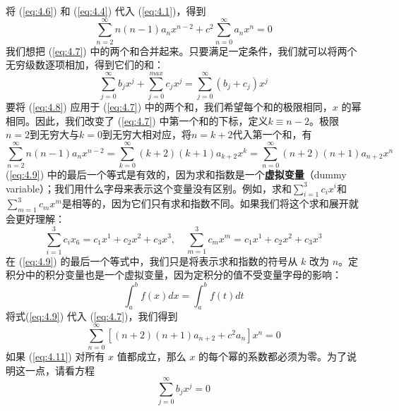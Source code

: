     将 (\ref{eq:4.6}) 和 (\ref{eq:4.4}) 代入 (\ref{eq:4.1})，得到
    \begin{equation}
        \sum_{n=2}^{\infty}n(n-1)a_nx^{n-2} + c^2\sum_{n=0}^{\infty}a_nx^n = 0
        \label{eq:4.7}
    \end{equation}
    我们想把 (\ref{eq:4.7}) 中的两个和合并起来。只要满足一定条件，我们就可以将两个无穷级数逐项相加，得到它们的和：
    \begin{equation}
        \sum_{j=0}^{\infty}b_jx^j + \sum_{j=0}^{max}c_jx^j = \sum_{j=0}^{\infty}(b_j+c_j)x^j
        \label{eq:4.8}
    \end{equation}
    要将 (\ref{eq:4.8}) 应用于 (\ref{eq:4.7}) 中的两个和，我们希望每个和的极限相同，$x$ 的幂相同。因此，我们改变了 (\ref{eq:4.7}) 中第一个和的下标，定义$k \equiv n-2$。极限$n = 2$到无穷大与$k = 0$到无穷大相对应，将$n=k+2$代入第一个和，有
    \begin{equation}
        \sum_{n=2}^{\infty}n\left(n-1\right)a_nx^{n-2} = \sum_{k=0}^{\infty}\left(k+2\right)\left(k+1\right)a_{k+2}x^k = \sum_{n=0}^{\infty}\left(n+2\right)\left(n+1\right)a_{n+2}x^n
        \label{eq:4.9}
    \end{equation}
    (\ref{eq:4.9}) 中的最后一个等式是有效的，因为求和指数是一个\textbf{虚拟变量}（dummy variable）；我们用什么字母来表示这个变量没有区别。例如，求和$\sum_{i=1}^{3}c_ix^i$和$\sum_{m=1}^{3}c_mx^m$是相等的，因为它们只有求和指数不同。如果我们将这个求和展开就会更好理解：
    \begin{equation*}
        \sum_{i=1}^{3}c_ix_6 = c_1x^1 + c_2x^2 + c_3x^3, \quad \sum_{m=1}^{3}c_mx^m = c_1x^1 + c_2x^2 + c_3x^3
    \end{equation*}
    在 (\ref{eq:4.9}) 的最后一个等式中，我们只是将表示求和指数的符号从 $k$ 改为 $n$。定积分中的积分变量也是一个虚拟变量，因为定积分的值不受变量字母的影响：
    \begin{equation}
        \int_{a}^{b}f\left(x\right)dx = \int_{a}^{b}f\left(t\right)dt
        \label{eq:4.10}
    \end{equation}
    将式(\ref{eq:4.9}) 代入 (\ref{eq:4.7})，我们得到
    \begin{equation}
        \sum_{n=0}^{\infty}\left[\left(n+2\right)\left(n+1\right)a_{n+2}+c^2a_n\right]x^n = 0
        \label{eq:4.11}
    \end{equation}
    如果 (\ref{eq:4.11}) 对所有 $x$ 值都成立，那么 $x$ 的每个幂的系数都必须为零。为了说明这一点，请看方程
    \begin{equation}
        \sum_{j=0}^{\infty}b_jx^j = 0
        \label{eq:4.12}
    \end{equation}
